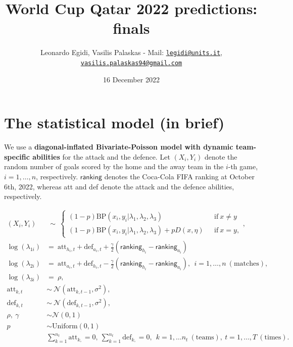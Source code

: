 \documentclass[
  10pt,
]{article}
\title{World Cup Qatar 2022 predictions: finals}
\author{Leonardo Egidi, Vasilis Palaskas - Mail:
\href{mailto:legidi@units.it}{\nolinkurl{legidi@units.it}},
\href{mailto:vasilis.palaskas94@gmail.com}{\nolinkurl{vasilis.palaskas94@gmail.com}}}
\date{16 December 2022}
\begin{document}
\maketitle

{
\setcounter{tocdepth}{2}
\tableofcontents
}
\hypertarget{the-statistical-model-in-brief}{%
\section{The statistical model (in
brief)}\label{the-statistical-model-in-brief}}

We use a \textbf{diagonal-inflated Bivariate-Poisson model with dynamic
team-specific abilities} for the attack and the defence. Let
\((X_{i}, Y_{i})\) denote the random number of goals scored by the home
and the away team in the \(i\)-th game, \(i=1,\ldots,n\), respectively.
\(\mathsf{ranking}\) denotes the Coca-Cola FIFA ranking at October 6th,
2022, whereas att and def denote the attack and the defence abilities,
respectively.

\begin{align}
(X_i, Y_i) &\ \sim \ \begin{cases} (1-p) \text{BP}(x_i, y_i |\lambda_1, \lambda_2, \lambda_3) \ \ \ & \text{if} \    x \ne y \\ (1-p) \text{BP}(x_i, y_i | \lambda_1, \lambda_2, \lambda_3) + pD(x, \eta) \ \ \ & \text{if} \   x = y, \end{cases}, \\
\log(\lambda_{1i}) &=\    \text{att}_{h_i, t}+ \text{def}_{a_i,t} + \frac{\gamma}{2}(\mathsf{ranking}_{h_i}-\mathsf{ranking}_{a_i}) \\
\log(\lambda_{2i}) & =\    \text{att}_{a_i,t} + \text{def}_{h_i,t} - \frac{\gamma}{2}(\mathsf{ranking}_{h_i}-\mathsf{ranking}_{a_i}), \ \ i=1,\ldots,n\ (\text{matches}), \\
\log(\lambda_{3i}) & =\ \rho,\\
\text{att}_{k, t}&  \sim \ \mathcal{N}(\text{att}_{k, t-1}, \sigma^2), \\
\text{def}_{k, t} & \sim \  \mathcal{N}(\text{def}_{k, t-1}, \sigma^2),\\
\rho, \ \gamma & \sim \mathcal{N}(0,1) \\
p & \sim \text{Uniform}(0,1)\\
& \sum_{k=1}^{n_t} \text{att}_{k, }=0, \  \sum_{k=1}^{n_t}\text{def}_{k, }=0, \ \ k=1,\ldots n_t \ (\text{teams}), \  t=1,\ldots, T \ (\text{times}).
\label{eq:scoring_rue}
\end{align}
\end{document}
